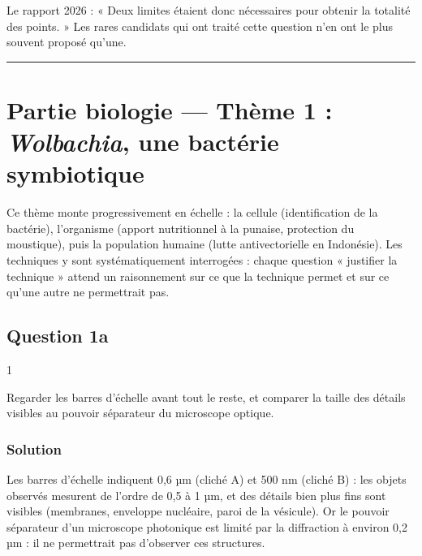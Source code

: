 \documentclass[11pt,a4paper]{article}
\begin{document}
\begin{jury}

Le rapport 2026 : « Deux limites étaient donc nécessaires pour obtenir la totalité des points. » Les rares candidats qui ont traité cette question n'en ont le plus souvent proposé qu'une.

\end{jury}

\begin{center}\rule{0.5\linewidth}{0.5pt}\end{center}

\hypertarget{partie-biologie-thuxe8me-1-wolbachia-une-bactuxe9rie-symbiotique}{%
\section{\texorpdfstring{Partie biologie --- Thème 1 : \emph{Wolbachia}, une bactérie symbiotique}{Partie biologie --- Thème 1 : Wolbachia, une bactérie symbiotique}}\label{partie-biologie-thuxe8me-1-wolbachia-une-bactuxe9rie-symbiotique}}

Ce thème monte progressivement en échelle : la cellule (identification de la bactérie), l'organisme (apport nutritionnel à la punaise, protection du moustique), puis la population humaine (lutte antivectorielle en Indonésie). Les techniques y sont systématiquement interrogées : chaque question « justifier la technique » attend un raisonnement sur ce que la technique permet et sur ce qu'une autre ne permettrait pas.

\hypertarget{question-1a}{%
\subsection{Question 1a}\label{question-1a}}

\begin{indication}{1}

Regarder les barres d'échelle avant tout le reste, et comparer la taille des détails visibles au pouvoir séparateur du microscope optique.

\end{indication}

\hypertarget{solution-41}{%
\subsubsection{Solution}\label{solution-41}}

Les barres d'échelle indiquent 0,6 µm (cliché A) et 500 nm (cliché B) : les objets observés mesurent de l'ordre de 0,5 à 1 µm, et des détails bien plus fins sont visibles (membranes, enveloppe nucléaire, paroi de la vésicule). Or le pouvoir séparateur d'un microscope photonique est limité par la diffraction à environ 0,2 µm : il ne permettrait pas d'observer ces structures.
\end{document}
